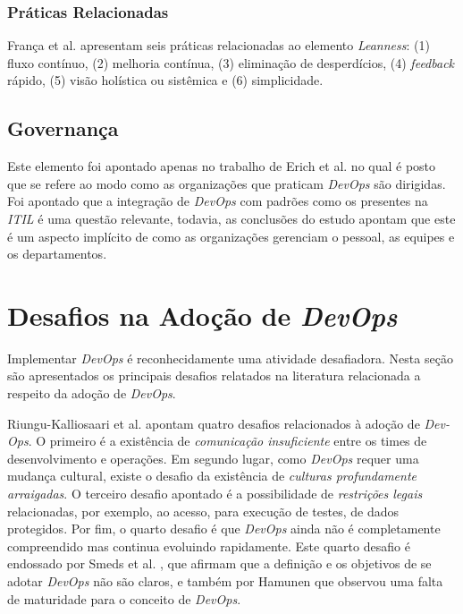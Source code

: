 \subsubsection{Práticas Relacionadas}
França et al. \cite{characterizing_devops} apresentam seis práticas
relacionadas ao elemento \textit{Leanness}: (1) fluxo contínuo, (2) melhoria
contínua, (3) eliminação de desperdícios, (4) \textit{feedback} rápido, (5)
visão holística ou sistêmica e (6) simplicidade.

\subsection{Governança}
Este elemento foi apontado apenas no trabalho de Erich et al. \cite{qualitative_devops_journalsw_17}
no qual é posto que se refere ao modo como as organizações que praticam {\it DevOps}
são dirigidas. Foi apontado que a integração de {\it DevOps} com padrões como
os presentes na \emph{\acrfull{ITIL}} é uma questão relevante, todavia, as conclusões do
estudo apontam que este é um aspecto implícito de como as organizações gerenciam
o pessoal, as equipes e os departamentos.

\section{Desafios na Adoção de \textit{DevOps}}\label{secao_desafios}

Implementar \textit{DevOps} é reconhecidamente uma atividade desafiadora. Nesta
seção são apresentados os principais desafios relatados na literatura
relacionada a respeito da adoção de \textit{DevOps}.

Riungu-Kalliosaari et al. \cite{devops_benefits_challenges} apontam quatro
desafios relacionados à adoção de \textit{Dev-Ops}. O primeiro é a existência
de \emph{comunicação insuficiente} entre os times de desenvolvimento e
operações. Em segundo lugar, como \textit{DevOps} requer
uma mudança cultural, existe o desafio da existência de \emph{culturas
profundamente arraigadas}. O terceiro desafio apontado é a possibilidade de
\emph{restrições legais} relacionadas, por exemplo, ao acesso, para execução de
testes, de dados protegidos. Por fim, o quarto desafio é que \textit{DevOps}
ainda não é completamente compreendido mas continua evoluindo rapidamente. Este
quarto desafio é endossado por Smeds et al. \cite{devops_a_definition}, que
afirmam que a definição e os objetivos de se adotar {\it DevOps} não são claros,
e também por Hamunen \cite{challenges_in_adopting_devops} que observou uma
falta de maturidade para o conceito de {\it DevOps}.

